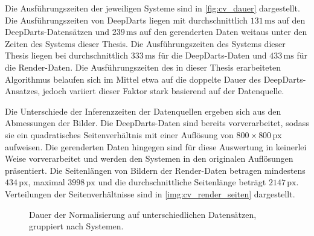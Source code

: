 Die Ausführungszeiten der jeweiligen Systeme sind in \autoref{fig:cv_dauer} dargestellt. Die Ausführungszeiten von DeepDarts liegen mit durchschnittlich $131\,\text{ms}$ auf den DeepDarts-Datensätzen und $239\,\text{ms}$ auf den gerenderten Daten weitaus unter den Zeiten des Systems dieser Thesis. Die Ausführungszeiten des Systems dieser Thesis liegen bei durchschnittlich $333\,\text{ms}$ für die DeepDarts-Daten und $433\,\text{ms}$ für die Render-Daten. Die Ausführungszeiten des in dieser Thesis erarbeiteten Algorithmus belaufen sich im Mittel etwa auf die doppelte Dauer des DeepDarts-Ansatzes, jedoch variiert dieser Faktor stark basierend auf der Datenquelle.

Die Unterschiede der Inferenzzeiten der Datenquellen ergeben sich aus den Abmessungen der Bilder. Die DeepDarts-Daten sind bereits vorverarbeitet, sodass sie ein quadratisches Seitenverhältnis mit einer Auflösung von $800 \times 800\,\text{px}$ aufweisen. Die gerenderten Daten hingegen sind für diese Auswertung in keinerlei Weise vorverarbeitet und werden den Systemen in den originalen Auflösungen präsentiert. Die Seitenlängen von Bildern der Render-Daten betragen mindestens $434\,\text{px}$, maximal $3998\,\text{px}$ und die durchschnittliche Seitenlänge beträgt $2147\,\text{px}$. Verteilungen der Seitenverhältnisse sind in \autoref{img:cv_render_seiten} dargestellt.

\begin{figure}
    \centering
    \caption{Dauer der Normalisierung auf unterschiedlichen Datensätzen, gruppiert nach Systemen.}
    \label{fig:cv_dauer}
\end{figure}

